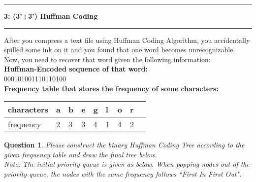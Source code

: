 \documentclass[10.5pt]{article}
\newcommand\question[2]{\vspace{.25in}\hrule\textbf{#1: #2}\vspace{.5em}\hrule\vspace{.10in}}
\newtheorem{Q}{Question}
\begin{document}
\newpage
\question{3}{(3'+3') Huffman Coding}
	
    After you compress a text file using Huffman Coding Algorithm, you accidentally spilled some ink on it and you found that one word becomes unrecognizable. Now, you need to recover that word given the following information:\\
    \textbf{Huffman-Encoded sequence of that word: } \\
    000101001110110100\\
    \textbf{Frequency table that stores the frequency of some characters: }
    \begin{table}[!hbtp]
    \begin{tabular}{|l|l|l|l|l|l|l|l|l|}
    \hline
    characters & a & b & e & g & l & o & r \\ \hline
    frequency  & 2 & 3 & 3 & 4 & 1 & 4 & 2 \\ \hline
    \end{tabular}
    \end{table}
	\begin{Q} Please construct the binary Huffman Coding Tree according to the given frequency table and draw the final tree below.\\
	Note: The initial priority queue is given as below. When popping nodes out of the priority queue, the nodes with the same frequency follows ``First In First Out".\\
	\end{Q}
\end{document}
